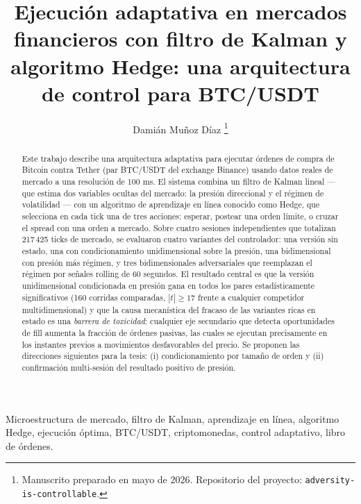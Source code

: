 \documentclass[journal,onecolumn,11pt]{IEEEtran}
\begin{document}
\title{Ejecución adaptativa en mercados financieros con filtro de Kalman y\\
       algoritmo Hedge: una arquitectura de control para BTC/USDT}

\author{Damián Muñoz Díaz%
\thanks{Manuscrito preparado en mayo de 2026.
        Repositorio del proyecto: \texttt{adversity-is-controllable}.}}


\maketitle

\begin{abstract}
Este trabajo describe una arquitectura adaptativa para ejecutar órdenes de
compra de Bitcoin contra Tether (par BTC/USDT del exchange Binance) usando
datos reales de mercado a una resolución de 100 ms. El sistema combina un
filtro de Kalman lineal --- que estima dos variables ocultas del mercado:
la presión direccional y el régimen de volatilidad --- con un algoritmo
de aprendizaje en línea conocido como Hedge, que selecciona en cada tick
una de tres acciones: esperar, postear una orden límite, o cruzar el spread
con una orden a mercado. Sobre cuatro sesiones independientes que totalizan
217\,425 ticks de mercado, se evaluaron cuatro variantes del controlador:
una versión sin estado, una con condicionamiento unidimensional sobre la
presión, una bidimensional con presión más régimen, y tres bidimensionales
adversariales que reemplazan el régimen por señales rolling de 60 segundos.
El resultado central es que la versión unidimensional condicionada en presión
gana en todos los pares estadísticamente significativos (160 corridas
comparadas, $|t|\!\geq\!17$ frente a cualquier competidor multidimensional)
y que la causa mecanística del fracaso de las variantes ricas en estado es
una \emph{barrera de toxicidad}: cualquier eje secundario que detecta
oportunidades de fill aumenta la fracción de órdenes pasivas, las cuales
se ejecutan precisamente en los instantes previos a movimientos
desfavorables del precio. Se proponen las direcciones siguientes para la
tesis: (i) condicionamiento por tamaño de orden y (ii) confirmación
multi-sesión del resultado positivo de presión.
\end{abstract}

\begin{IEEEkeywords}
Microestructura de mercado, filtro de Kalman, aprendizaje en línea,
algoritmo Hedge, ejecución óptima, BTC/USDT, criptomonedas, control
adaptativo, libro de órdenes.
\end{IEEEkeywords}
\end{document}
